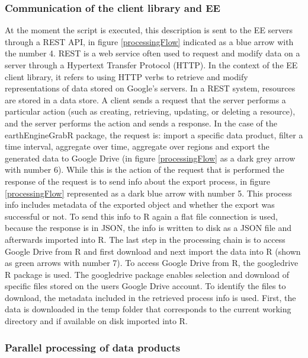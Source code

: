 \subsubsection{Communication of the client library and EE}

At the moment the script is executed, this description is sent to the EE servers through a REST API, in figure \ref{processingFlow} indicated as a blue arrow with the number 4. REST is a web service often used to request and modify data on a server through a Hypertext Transfer Protocol (HTTP).
In the context of the EE client library, it refers to using HTTP verbs to retrieve and modify representations of data stored on Google's servers.
In a REST system, resources are stored in a data store. A client sends a request that the server performs a particular action (such as creating, retrieving, updating, or deleting a resource), and the server performs the action and sends a response. In the case of the earthEngineGrabR package, the request is: import a specific data product, filter a time interval, aggregate over time, aggregate over regions and export the generated data to Google Drive (in figure \ref{processingFlow} as a dark grey arrow with number 6). While this is the action of the request that is performed the response of the request is to send info about the export process, in figure \ref{processingFlow} represented as a dark blue arrow with number 5. This process info includes metadata of the exported object and whether the export was successful or not. To send this info to R again a flat file connection is used, because the response is in JSON, the info is written to disk as a JSON file and afterwards imported into R. The last step in the processing chain is to access Google Drive from R and first download and next import the data into R (shown as green arrows with number 7). To access Google Drive from R, the googledrive R package is used. The googledrive package enables selection and download of specific files stored on the users Google Drive account. To identify the files to download, the metadata included in the retrieved process info is used. First, the data is downloaded in the temp folder that corresponds to the current working directory and if available on disk imported into R.

\subsubsection{Parallel processing of data products}


